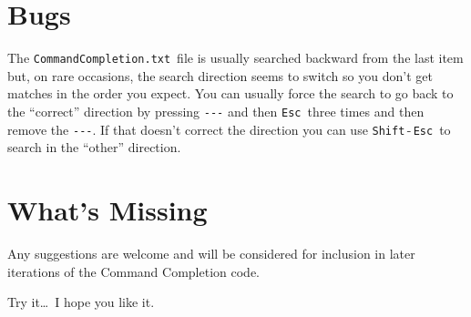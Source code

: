 \documentclass[11pt]{article}
\newcommand{\esckey}{\texttt{Esc}}
\newcommand{\shiftkey}{\texttt{Shift}}
\newcommand{\CCT}{\texttt{CommandCompletion.txt}}
\begin{document}
\section*{Bugs}

The \CCT\ file is usually searched backward from the last item but, on rare occasions, the search direction seems to switch so you don't get matches in the order you expect. You can usually force the search to go back to the ``correct'' direction by pressing \verb+---+ and then \esckey\ three times and then remove the \verb+---+. If that doesn't correct the direction you can use \shiftkey\,-\,\esckey\ to search in the ``other'' direction.

\section*{What's Missing}

Any suggestions are welcome and will be considered for inclusion in later iterations of the Command Completion code.

\vspace{5pt plus 2pt minus 1pt}\noindent
Try it\dots\ I hope you like it.

\end{document}
